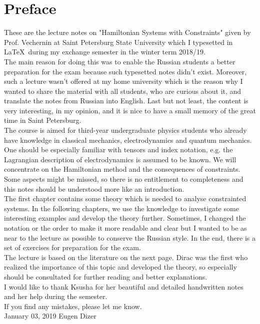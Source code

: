 \chapter*{Preface}

These are the lecture notes on "Hamiltonian Systems with Constraints" given by Prof. Vechernin at Saint Petersburg State University which I typesetted in \LaTeX \ during my exchange semester in the winter term 2018/19. \\

The main reason for doing this was to enable the Russian students a better preparation for the exam because such typesetted notes didn't exist. Moreover, such a lecture wasn't offered at my home university which is the reason why I wanted to share the material with all students, who are curious about it, and translate the notes from Russian into English. Last but not least, the content is very interesting, in my opinion, and it is nice to have a small memory of the great time in Saint Petersburg. \\

The course is aimed for third-year undergraduate physics students who already have knowledge in classical mechanics, electrodynamics and quantum mechanics. One should be especially familiar with tensors and index notation, e.g. the Lagrangian description of electrodynamics is assumed to be known.
We will concentrate on the Hamiltonian method and the consequences of constraints. Some aspects might be missed, so there is no entitlement to completeness and this notes should be understood more like an introduction. \\

The first chapter contains some theory which is needed to analyse constrainted systems. In the following chapters, we use the knowledge to investigate some interesting examples and develop the theory further.
Sometimes, I changed the notation or the order to make it more readable and clear but I wanted to be as near to the lecture as possible to conserve the Russian style. In the end, there is a set of exercises for preparation for the exam.  \\

The lecture is based on the literature on the next page. Dirac was the first who realized the importance of this topic and developed the theory, so especially \cite{1} should be consultated for further reading and better explanations. \\

I would like to thank Ksusha for her beautiful and detailed handwritten notes and her help during the semester. \\


If you find any mistakes, please let me know. \\


January 03, 2019 \hfill Eugen Dizer 